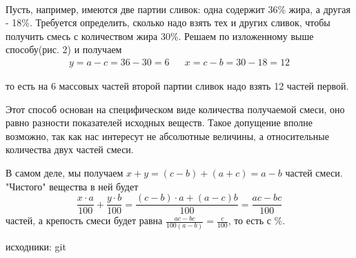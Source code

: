 \begin{multicols}{2}
\begin{minipage}[h]{0.49\linewidth}
\caption{рис. 1}
\end{minipage}
\hfill
\begin{minipage}[h]{0.49\linewidth}
 \\
\caption{рис. 2}
\end{minipage}


\par
Пусть, например, имеются две партии сливок: одна содержит 36\% жира, а другая - 18\%. Требуется определить, сколько надо взять тех и других сливок, чтобы получить смесь с количеством жира 30\%. Решаем по изложенному выше способу(рис. 2) и получаем
\begin{equation*}
    \begin{split}
        y=a-c=36-30=6&
        &x=c-b=30-18=12
    \end{split}
\end{equation*}




то есть на 6 массовых частей второй партии сливок надо взять 12 частей первой.
\par
Этот способ основан на специфическом виде количества получаемой смеси, оно равно разности показателей исходных веществ. Такое допущение вполне возможно, так как нас интересут не абсолютные величины, а относительные количества двух частей смеси.
\par 
В самом деле, мы получаем $x+y=(c-b)+(a+c)=a-b$ частей смеси. "Чистого" вещества в ней будет \begin{equation*}
    \frac{x \cdot a}{100}+\frac{y \cdot b}{100}=\frac{(c-b)\cdot a+ (a-c)b}{100}=\frac{ac-bc}{100}
\end{equation*}
частей, а крепость смеси будет равна $\frac{ac-bc}{100(a-b)}=\frac{c}{100}$, то есть с \%.
\end{multicols}

\newpage
исходники: git